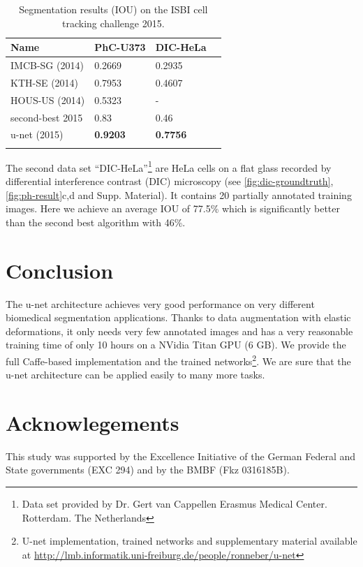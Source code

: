 \documentclass{llncs}
\begin{document}
\begin{table}[tbp]
  \centering
  \caption{Segmentation results (IOU) on the ISBI cell tracking challenge 2015.}
  \begin{tabular}{l@{~~~}l@{~~~}ll}
    \toprule
    Name     &  PhC-U373 & DIC-HeLa \\
    \midrule
    IMCB-SG (2014) & 0.2669    & 0.2935 \\
    KTH-SE  (2014) & 0.7953    & 0.4607 \\
    HOUS-US (2014) & 0.5323    & - \\
    second-best 2015 & 0.83    & 0.46 \\
    u-net (2015)   & \textbf{0.9203}   & \textbf{0.7756} \\
    \bottomrule\\[-0.8cm]
  \end{tabular}
  \label{tab:light-results}
\end{table}
The second data set ``DIC-HeLa''\footnote{Data set provided by Dr. Gert van Cappellen Erasmus Medical Center. Rotterdam. The Netherlands} are HeLa cells on a flat glass  recorded by differential interference contrast (DIC) microscopy (see \autoref{fig:dic-groundtruth}, \autoref{fig:ph-result}c,d and Supp. Material). It contains 20 partially annotated training images. Here we achieve an average IOU of 77.5\% which is significantly better than the second best algorithm with 46\%.


\section{Conclusion}
The u-net architecture achieves very good performance on very different biomedical segmentation applications. Thanks to data augmentation with elastic deformations, it only needs very few annotated images and has a very reasonable training time of only 10 hours on a NVidia Titan GPU (6 GB).
We provide the full Caffe\cite{Caffe}-based implementation and the trained networks\footnote{U-net implementation, trained networks and supplementary material available at \href{http://lmb.informatik.uni-freiburg.de/people/ronneber/u-net}{http://lmb.informatik.uni-freiburg.de/people/ronneber/u-net}}. We are sure that the u-net architecture can be applied easily to many more tasks.

\section*{Acknowlegements}
This study was supported by the Excellence Initiative of
the German Federal and State governments (EXC 294) and by the BMBF (Fkz 0316185B).




\end{document}
